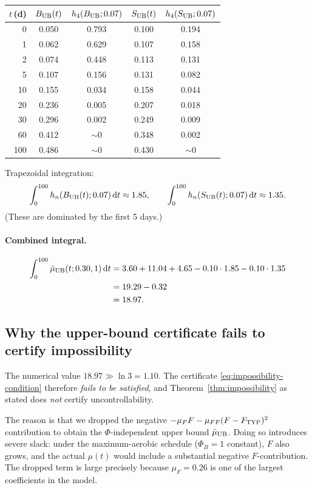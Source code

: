 \documentclass[11pt,a4paper]{article}
\theoremstyle{definition}
\newcommand{\dd}{\,\mathrm{d}}
\begin{document}
\begin{center}\small
\begin{tabular}{rcc cc}
\toprule
$t$\,(d) & $B_{\rm UB}(t)$ & $h_4(B_{\rm UB}; 0.07)$ & $S_{\rm UB}(t)$ & $h_4(S_{\rm UB}; 0.07)$ \\
\midrule
0    & 0.050 & 0.793 & 0.100 & 0.194 \\
1    & 0.062 & 0.629 & 0.107 & 0.158 \\
2    & 0.074 & 0.448 & 0.113 & 0.131 \\
5    & 0.107 & 0.156 & 0.131 & 0.082 \\
10   & 0.155 & 0.034 & 0.158 & 0.044 \\
20   & 0.236 & 0.005 & 0.207 & 0.018 \\
30   & 0.296 & 0.002 & 0.249 & 0.009 \\
60   & 0.412 & $\sim 0$ & 0.348 & 0.002 \\
100  & 0.486 & $\sim 0$ & 0.430 & $\sim 0$ \\
\bottomrule
\end{tabular}
\end{center}

Trapezoidal integration:
\[
\int_0^{100} h_n(B_{\rm UB}(t); 0.07) \dd t \approx 1.85, \qquad \int_0^{100} h_n(S_{\rm UB}(t); 0.07) \dd t \approx 1.35.
\]
(These are dominated by the first 5 days.)

\paragraph{Combined integral.}
\begin{align*}
\int_0^{100} \bar\mu_{\rm UB}(t; 0.30, 1) \dd t &= 3.60 + 11.04 + 4.65 - 0.10 \cdot 1.85 - 0.10 \cdot 1.35 \\
&= 19.29 - 0.32 \\
&= 18.97.
\end{align*}

\subsection{Why the upper-bound certificate fails to certify impossibility}

The numerical value $18.97 \gg \ln 3 = 1.10$. The certificate \eqref{eq:impossibility-condition} therefore \emph{fails to be satisfied}, and Theorem~\ref{thm:impossibility} as stated does \emph{not} certify uncontrollability.

The reason is that we dropped the negative $-\mu_F F - \mu_{FF}(F-F_{\rm TYP})^2$ contribution to obtain the $\Phi$-independent upper bound $\bar\mu_{\rm UB}$. Doing so introduces severe slack: under the maximum-aerobic schedule ($\Phi_B = 1$ constant), $F$ also grows, and the actual $\mu(t)$ would include a substantial negative $F$-contribution. The dropped term is large precisely because $\mu_F = 0.26$ is one of the largest coefficients in the model.
\end{document}

